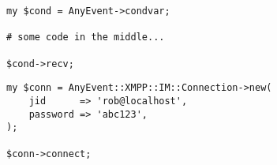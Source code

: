 \begin{framed}
\begin{verbatim}
my $cond = AnyEvent->condvar;

# some code in the middle...

$cond->recv;
\end{verbatim}
\end{framed}

\begin{comment}
This is how you run an AnyEvent event loop.  If you're not familiar with AnyEvent, I suggest you read up on it; however, intimate knowledge of it is not necessary for this tutorial.
\end{comment}

\newpage
\begin{framed}
\begin{verbatim}
my $conn = AnyEvent::XMPP::IM::Connection->new(
    jid      => 'rob@localhost',
    password => 'abc123',
);

$conn->connect;
\end{verbatim}
\end{framed}

\begin{comment}
Creates a connection object and connects when the event loop starts running.
Authenticates as rob@localhost, using the password 'abc123'.
\end{comment}
